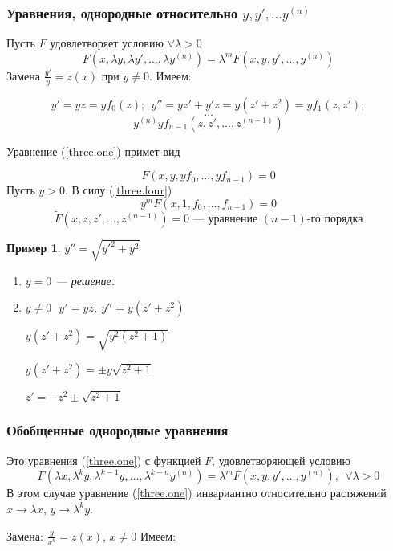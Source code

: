 \documentclass{article}
\newtheorem{xmp}{Пример}
\newcommand{\re}[1]{(\ref{#1})}
\begin{document}
  \subsubsection{Уравнения, однородные относительно $y, y', \ldots y^{(n)}$}
  Пусть $F$ удовлетворяет условию $\forall \lambda > 0$
  \begin{equation}
  \label{three.four}
  F(x , \lambda y, \lambda y', \ldots, \lambda y^{(n)}) = \lambda^m F(x , y, y', \ldots, y^{(n)})
  \end{equation}
  Замена $\frac{y'}{y} = z(x)$ при $y \neq 0$. Имеем:

  \[ y' = yz = yf_0(z);~~ y'' = yz' + y'z = y(z' + z^2) = yf_1(z, z'); \]
  \[\ldots\]
  \[y ^{(n)} yf_{n-1}(z, z', \ldots, z^{(n-1)}) \]

  \noindent Уравнение \re{three.one} примет вид

  \[ F(x, y, yf_0, \ldots, yf_{n - 1}) = 0 \]
  Пусть $y > 0$. В силу \re{three.four}
  \[ y^mF(x, 1, f_0, \ldots, f_{n-1}) = 0\]
  \[\tilde{F}(x, z, z', \ldots, z^{(n-1)}) = 0 \text{ --- уравнение $(n-1)$-го порядка}\]
  \begin{xmp}{$y'' = \sqrt{y'^2 + y^2}$}
  \begin{enumerate}
  \item $y = 0$ --- решение.
  \item $y \neq 0 ~~~ y' = yz,~ y'' = y(z' + z^2)$

  \noindent $y(z' + z^2) = \sqrt{y^2(z^2 + 1)}$

  \noindent $y(z' + z^2) = \pm y\sqrt{z^2 + 1}$

  \noindent $z' = -z^2 \pm \sqrt{z^2 + 1}$
  \end{enumerate}
  \end{xmp}

  \subsubsection{Обобщенные однородные уравнения}
  Это уравнения \re{three.one} с функцией $F$, удовлетворяющей условию
  \begin{equation}
  \label{three.five}
  F(\lambda x, \lambda^ky, \lambda^{k - 1}y, \ldots, \lambda^{k - n}y^{(n)}) = \lambda^m F(x, y, y', \ldots, y^{(n)}),~~ \forall \lambda > 0
  \end{equation}
  В этом случае уравнение \re{three.one} инвариантно относительно растяжений $x \rightarrow \lambda x$, $y \rightarrow \lambda^k y$.

  \noindent Замена: $\frac{y}{x^k} = z(x)$, $x \neq 0$ Имеем:
\end{document}
